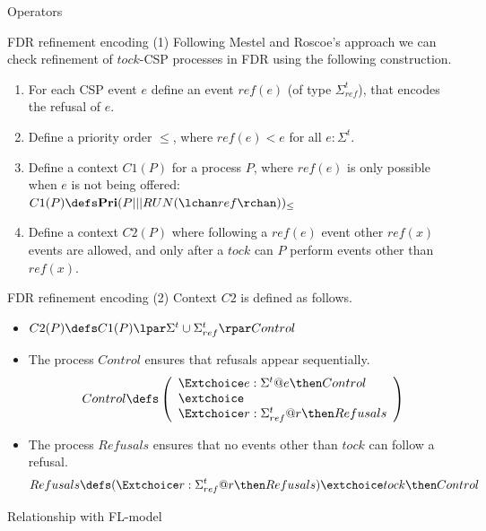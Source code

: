 \documentclass[fleqn]{beamer}
\newenvironment{slide-nocite}[1]
{\begin{frame}[fragile,environment=slide-nocite]
\frametitle{#1}\begin{refsegment}}
{\end{refsegment}\end{frame}}%
\begin{document}
\begin{slide-nocite}{Operators}
\end{slide-nocite}

\begin{slide-nocite}{FDR refinement encoding (1)}
Following Mestel and Roscoe's approach we can check refinement of $tock$-CSP processes
in FDR using the following construction.
\begin{enumerate}
  \item For each CSP event $e$ define an event $ref(e)$ (of type $\Sigma^{t}_{ref}$), that encodes the refusal of $e$.
  \item Define a priority order $\leq$, where $ref(e) < e$ for all $e : \Sigma^{t}$.
  \item Define a context $C1(P)$ for a process $P$, where $ref(e)$ is only possible
        when $e$ is not being offered:\\
        $C1(P) \circdef \mathbf{Pri}(P ||| RUN(\lchan ref\rchan))_{\leq}$
  \item Define a context $C2(P)$ where following a $ref(e)$ event other $ref(x)$ events are
        allowed, and only after a $tock$ can $P$ perform events other than $ref(x)$.
\end{enumerate}
\end{slide-nocite}

\begin{slide-nocite}{FDR refinement encoding (2)}
Context $C2$ is defined as follows.
\begin{itemize}
  \item $C2(P) \circdef C1(P) \lpar \Sigma^{t} \cup \Sigma^{t}_{ref} \rpar Control$
  \item The process $Control$ ensures that refusals appear sequentially.
   \begin{align*}
      Control \circdef \left(\begin{array}{l}
        \Extchoice e : \Sigma^{t} @ e \then Control
        \\ \extchoice \\
        \Extchoice r : \Sigma^{t}_{ref} @ r \then Refusals
      \end{array}\right)
    \end{align*}
  \item The process $Refusals$ ensures that no events other than $tock$ can follow
    a refusal.
    \begin{align*}
      Refusals \circdef (\Extchoice r : \Sigma^{t}_{ref} @ r \then Refusals) \extchoice tock \then Control
    \end{align*}
\end{itemize}
\end{slide-nocite}

\begin{slide-nocite}{Relationship with FL-model}

\end{slide-nocite}
\end{document}

